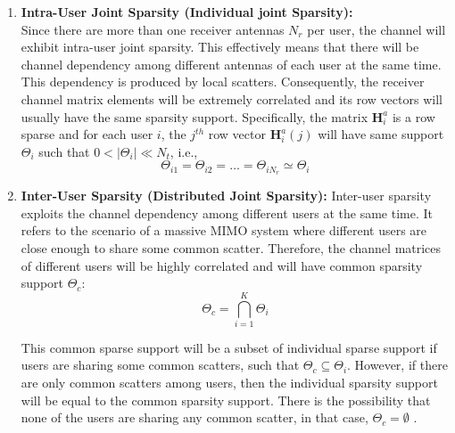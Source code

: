\begin{enumerate}
\item \textbf{Intra-User Joint Sparsity (Individual joint Sparsity):}\\
Since there are more than one receiver antennas $N_r$  per user, the channel will exhibit intra-user joint sparsity. This effectively means that there will be channel dependency among different antennas of each user at the same time. This dependency is produced by local scatters.  Consequently, the receiver channel matrix elements will be extremely correlated and its row vectors will usually have the same sparsity support. Specifically, the matrix $\mathbf{H}_i^a$ is a row sparse and for each user $i$, the $j^{th}$ row vector $\mathbf{H}_i^a(j)$ will have same support $\Theta_i$ such that $0<|\Theta_i|\ll N_t$, i.e.,
\begin{equation}
    \Theta_{i1}=\Theta_{i2}=\hdots =\Theta_{iN_r}
    \simeq\Theta_i
\end{equation}
\item \textbf{Inter-User Sparsity (Distributed Joint Sparsity):}
Inter-user sparsity exploits the channel dependency among different users at the same time\cite{book_enrico}. It refers to the scenario of a massive MIMO system where different users are close enough to share some common scatter. Therefore, the channel matrices of different users will be highly correlated and will have common sparsity support $\Theta_c$:
\begin{equation}
    \Theta_c= \bigcap_{i=1}^{K} \Theta_i
\end{equation}

This common sparse support will be a subset of individual sparse support if users are sharing some common scatters, such that $\Theta_c \subseteq \Theta_i$. However, if there are only common scatters among users, then the individual sparsity support will be equal to the common sparsity support.
There is the possibility that none of the users are sharing any common scatter, in that case, $\Theta_c=\emptyset$  \cite{mainref-joint}.
\end{enumerate}

